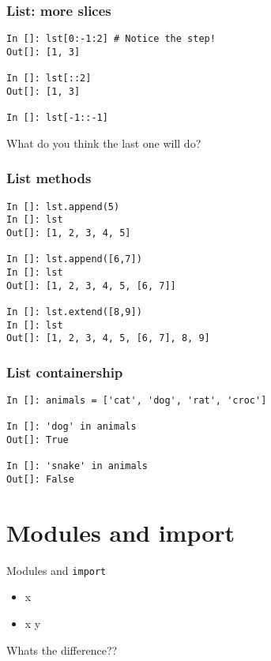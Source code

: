 \documentclass[14pt,compress]{beamer}
\newcounter{time}
\newcommand{\inctime}[1]{\addtocounter{time}{#1}{\tiny \thetime\ m}}
\newcommand{\typ}[1]{\lstinline{#1}}
\newcommand{\kwrd}[1]{ \texttt{\textbf{\color{blue}{#1}}}  }
\begin{document}
\begin{frame}[fragile]
  \frametitle{List: more slices}
\begin{lstlisting}
In []: lst[0:-1:2] # Notice the step!
Out[]: [1, 3]

In []: lst[::2]
Out[]: [1, 3]

In []: lst[-1::-1]
\end{lstlisting}
What do you think the last one will do?
\end{frame}

\begin{frame}[fragile]
  \frametitle{List methods}
\begin{lstlisting}
In []: lst.append(5)
In []: lst
Out[]: [1, 2, 3, 4, 5]

In []: lst.append([6,7])
In []: lst
Out[]: [1, 2, 3, 4, 5, [6, 7]]

In []: lst.extend([8,9])
In []: lst
Out[]: [1, 2, 3, 4, 5, [6, 7], 8, 9]
\end{lstlisting}
\end{frame}

\begin{frame}[fragile]
  \frametitle{List containership}
  \begin{lstlisting}
In []: animals = ['cat', 'dog', 'rat', 'croc']

In []: 'dog' in animals
Out[]: True

In []: 'snake' in animals
Out[]: False
  \end{lstlisting}
  \inctime{10}
\end{frame}

\section{Modules and import}
\begin{frame}{Modules and \typ{import}}
  \begin{itemize}
    \item \kwrd{import} x
    \item \kwrd{from} x \kwrd{import} y
  \end{itemize}
Whats the difference??
\inctime{5}
\end{frame}
\end{document}
